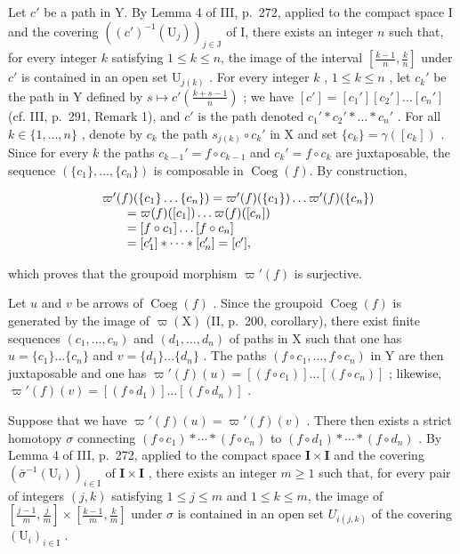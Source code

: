 Let \(c'\) be a path in Y. By Lemma 4 of III, p.~272, applied to the compact space I and the covering \(((c')^{-1}(\mathrm{U}_j))_{j\in \mathrm{J}}\) of I, there exists an integer \(n\) such that, for every integer \(k\) satisfying \(1\leqslant k\leqslant n\), the image of the interval \([\frac{k - 1}{n},\frac{k}{n}]\) under \(c'\) is contained in an open set \(\mathrm{U}_{j(k)}\) . For every integer \(k\) , \(1\leqslant k\leqslant n\) , let \(c_k'\) be the path in Y defined by \(s\mapsto c'(\frac{k + s - 1}{n})\) ; we have \([c'] = [c_1'][c_2']\ldots [c_n']\) (cf. III, p.~291, Remark 1), and \(c'\) is the path denoted \(c_1' * c_2' * \dots * c_n'\) . For all \(k\in \{1,\ldots ,n\}\) , denote by \(c_k\) the path \(s_{j(k)}\circ c_k'\) in X and set \(\{c_k\} = \gamma ([c_k])\) . Since for every \(k\) the paths \(c_{k - 1}' = f\circ c_{k - 1}\) and \(c_k' = f\circ c_k\) are juxtaposable, the sequence \((\{c_1\} ,\ldots ,\{c_n\})\) is composable in \(\operatorname{Coeg}(f)\). By construction,

\[
\begin{array}{r l} & {\varpi^ {\prime} (f) (\{c _ {1} \} \ldots \{c _ {n} \}) = \varpi^ {\prime} (f) (\{c _ {1} \}) \ldots \varpi^ {\prime} (f) (\{c _ {n} \})} \\ & {\qquad = \varpi (f) ([ c _ {1} ]) \ldots \varpi (f) ([ c _ {n} ])} \\ & {\qquad = [ f \circ c _ {1} ] \ldots [ f \circ c _ {n} ]} \\ & {\qquad = [ c _ {1} ^ {\prime} ] * \dots * [ c _ {n} ^ {\prime} ] = [ c ^ {\prime} ],} \end{array}
\]

which proves that the groupoid morphism \(\varpi'(f)\) is surjective.

Let \(u\) and \(v\) be arrows of \(\operatorname{Coeg}(f)\) . Since the groupoid \(\operatorname{Coeg}(f)\) is generated by the image of \(\varpi(\mathrm{X})\) (II, p.~200, corollary), there exist finite sequences \((c_1, \ldots, c_n)\) and \((d_1, \ldots, d_n)\) of paths in X such that one has \(u = \{c_1\} \ldots \{c_n\}\) and \(v = \{d_1\} \ldots \{d_n\}\) . The paths \((f \circ c_1, \ldots, f \circ c_n)\) in Y are then juxtaposable and one has \(\varpi'(f)(u) = [(f \circ c_1)] \ldots [(f \circ c_n)]\) ; likewise, \(\varpi'(f)(v) = [(f \circ d_1)] \ldots [(f \circ d_n)]\) .

Suppose that we have \(\varpi'(f)(u) = \varpi'(f)(v)\) . There then exists a strict homotopy \(\sigma\) connecting \((f \circ c_1) * \cdots * (f \circ c_n)\) to \((f \circ d_1) * \cdots * (f \circ d_n)\) . By Lemma 4 of III, p.~272, applied to the compact space \(\mathbf{I} \times \mathbf{I}\) and the covering \((\bar{\sigma}^{-1}(\mathrm{U}_i))_{i \in \mathrm{I}}\) of \(\mathbf{I} \times \mathbf{I}\) , there exists an integer \(m \geqslant 1\) such that, for every pair of integers \((j,k)\) satisfying \(1 \leqslant j \leqslant m\) and \(1 \leqslant k \leqslant m\), the image of \([\frac{j-1}{m}, \frac{j}{m}] \times [\frac{k-1}{m}, \frac{k}{m}]\) under \(\sigma\) is contained in an open set \(U_{i(j,k)}\) of the covering \((\mathrm{U}_{i})_{i \in \mathrm{I}}\) .

